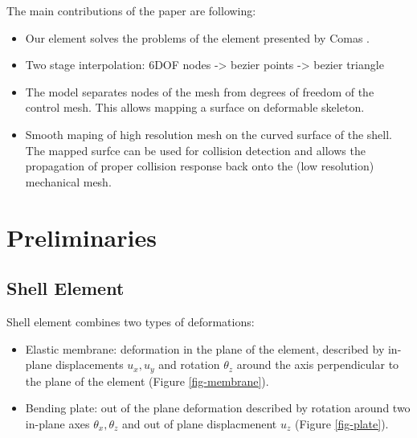 \documentclass{egpubl}
\begin{document}
The main contributions of the paper are following:
\begin{itemize}
    \item Our element solves the problems of the element presented by Comas
        \cite{Comas2010c}.

    \item Two stage interpolation: 6DOF nodes -> bezier points -> bezier
        triangle

    \item The model separates nodes of the mesh from degrees of freedom of the
        control mesh. This allows mapping a surface on deformable skeleton.

    \item Smooth maping of high resolution mesh on the curved surface of the
        shell. The mapped surfce can be used for collision detection and
        allows the propagation of proper collision response back onto the
        (low resolution) mechanical mesh.

\end{itemize}


\section{Preliminaries}

\subsection{Shell Element}

Shell element combines two types of deformations:

\begin{itemize}

    \item Elastic membrane: deformation in the plane of the element,
        described by in-plane displacements $u_x, u_y$ and rotation
        $\theta_z$ around the axis perpendicular to the plane of the
        element (Figure \ref{fig-membrane}).

    \item Bending plate: out of the plane deformation described by rotation
        around two in-plane axes $\theta_x, \theta_z$ and out of plane
        displacmenent $u_z$ (Figure \ref{fig-plate}).

\end{itemize}
\end{document}
